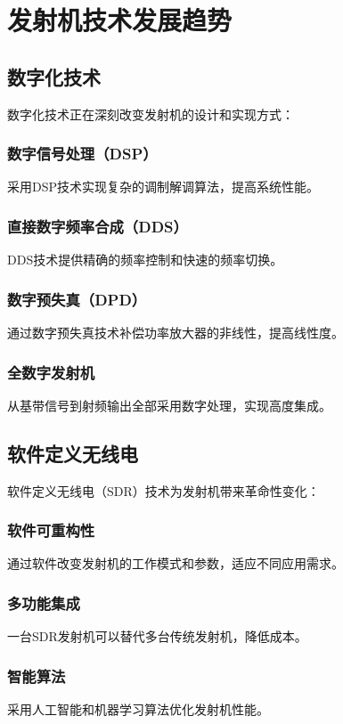 \documentclass[12pt,UTF8]{ctexbook}
\begin{document}
\section{发射机技术发展趋势}

\subsection{数字化技术}

数字化技术正在深刻改变发射机的设计和实现方式：

\subsubsection{数字信号处理（DSP）}
采用DSP技术实现复杂的调制解调算法，提高系统性能。

\subsubsection{直接数字频率合成（DDS）}
DDS技术提供精确的频率控制和快速的频率切换。

\subsubsection{数字预失真（DPD）}
通过数字预失真技术补偿功率放大器的非线性，提高线性度。

\subsubsection{全数字发射机}
从基带信号到射频输出全部采用数字处理，实现高度集成。

\subsection{软件定义无线电}

软件定义无线电（SDR）技术为发射机带来革命性变化：

\subsubsection{软件可重构性}
通过软件改变发射机的工作模式和参数，适应不同应用需求。

\subsubsection{多功能集成}
一台SDR发射机可以替代多台传统发射机，降低成本。

\subsubsection{智能算法}
采用人工智能和机器学习算法优化发射机性能。
\end{document}
